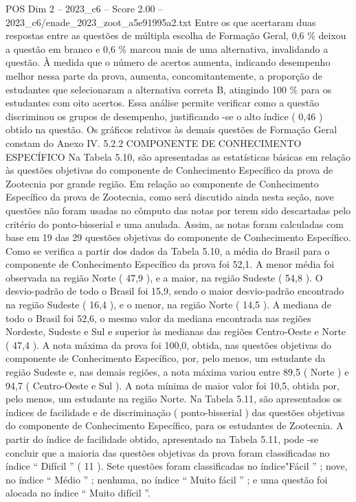 \begin{textsample}{POS Dim 2 – 2023\_c6 – Score 2.00 – 2023\_c6/enade\_2023\_zoot\_a5e91995a2.txt}
Entre os que acertaram duas respostas entre as questões de múltipla escolha de Formação Geral, 0,6 \% deixou a questão em branco e 0,6 \% marcou mais de uma alternativa, invalidando a questão.
À medida que o número de acertos aumenta, indicando desempenho melhor nessa parte da prova, aumenta, concomitantemente, a proporção de estudantes que selecionaram a alternativa correta B, atingindo 100 \% para os estudantes com oito acertos.
Essa análise permite verificar como a questão discriminou os grupos de desempenho, justificando -se o alto índice ( 0,46 ) obtido na questão.
Os gráficos relativos às demais questões de Formação Geral constam do Anexo IV. 5.2.2 COMPONENTE DE CONHECIMENTO ESPECÍFICO Na Tabela 5.10, são apresentadas as estatísticas básicas em relação às questões objetivas do componente de Conhecimento Específico da prova de Zootecnia por grande região.
Em relação ao componente de Conhecimento Específico da prova de Zootecnia, como será discutido ainda nesta seção, nove questões não foram usadas no cômputo das notas por terem sido descartadas pelo critério do ponto-bisserial e uma anulada.
Assim, as notas foram calculadas com base em 19 das 29 questões objetivas do componente de Conhecimento Específico.
Como se verifica a partir dos dados da Tabela 5.10, a média do Brasil para o componente de Conhecimento Específico da prova foi 52,1.
A menor média foi observada na região Norte ( 47,9 ), e a maior, na região Sudeste ( 54,8 ).
O desvio-padrão de todo o Brasil foi 15,9, sendo o maior desvio-padrão encontrado na região Sudeste ( 16,4 ), e o menor, na região Norte ( 14,5 ).
A mediana de todo o Brasil foi 52,6, o mesmo valor da mediana encontrada nas regiões Nordeste, Sudeste e Sul e superior às medianas das regiões Centro-Oeste e Norte ( 47,4 ).
A nota máxima da prova foi 100,0, obtida, nas questões objetivas do componente de Conhecimento Específico, por, pelo menos, um estudante da região Sudeste e, nas demais regiões, a nota máxima variou entre 89,5 ( Norte ) e 94,7 ( Centro-Oeste e Sul ).
A nota mínima de maior valor foi 10,5, obtida por, pelo menos, um estudante na região Norte.
Na Tabela 5.11, são apresentados os índices de facilidade e de discriminação ( ponto-bisserial ) das questões objetivas do componente de Conhecimento Específico, para os estudantes de Zootecnia.
A partir do índice de facilidade obtido, apresentado na Tabela 5.11, pode -se concluir que a maioria das questões objetivas da prova foram classificadas no índice “ Difícil ” ( 11 ).
Sete questões foram classificadas no índice"Fácil ” ; nove, no índice “ Médio ” ; nenhuma, no índice “ Muito fácil ” ; e uma questão foi alocada no índice “ Muito difícil ”.

\end{textsample}
